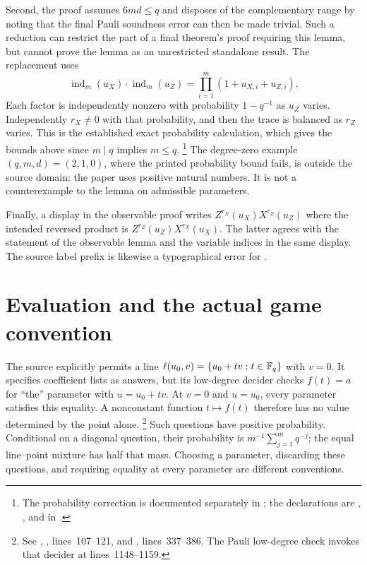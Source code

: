 \documentclass[11pt]{article}
\newcommand{\ind}{\operatorname{ind}}
\begin{document}
Second, the proof assumes $6md\leq q$ and disposes of the complementary range
by noting that the final Pauli soundness error can then be made trivial.
Such a reduction can restrict the part of a final theorem's proof requiring
this lemma, but cannot prove the lemma as an unrestricted standalone result.
The replacement uses
\[
  \ind_m(u_X)\cdot\ind_m(u_Z)
  =\prod_{i=1}^m(1+u_{X,i}+u_{Z,i}).
\]
Each factor is independently nonzero with probability $1-q^{-1}$ as $u_Z$
varies. Independently $r_X\ne0$ with that probability, and then the trace is
balanced as $r_Z$ varies. This is the established exact probability calculation,
which gives the bounds above since $m\mid q$ implies $m\leq q$.%
\footnote{The probability correction is documented separately in
; the declarations
are , , and
 in
.}
The degree-zero example $(q,m,d)=(2,1,0)$, where the printed probability
bound fails, is outside the source domain: the paper uses positive natural
numbers. It is not a counterexample to the lemma on admissible parameters.

Finally, a display in the observable proof writes
$Z^{r_X}(u_X)X^{r_Z}(u_Z)$ where the intended reversed product is
$Z^{r_Z}(u_Z)X^{r_X}(u_X)$. The latter agrees with the statement of the
observable lemma and the variable indices in the same display. The source label prefix
 is likewise a typographical error for
.

\section{Evaluation and the actual game convention}

The source explicitly permits a line $\ell(u_0,v)=\{u_0+tv:t\in\mathbb{F}_q\}$
with $v=0$. It specifies coefficient lists as answers, but its low-degree
decider checks $f(t)=a$ for ``the'' parameter with $u=u_0+tv$. At $v=0$
and $u=u_0$, every parameter satisfies this equality. A nonconstant function
$t\mapsto f(t)$ therefore has no value determined by the point alone.%
\footnote{See ,
, lines~107--121, and , lines~337--386.
The Pauli low-degree check invokes that decider at lines~1148--1159.}
Such questions have positive probability. Conditional on a diagonal question,
their probability is $m^{-1}\sum_{j=1}^m q^{-j}$; the equal line--point mixture
has half that mass. Choosing a parameter, discarding these questions, and
requiring equality at every parameter are different conventions.
\end{document}
